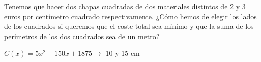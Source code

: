\documentclass[addpoints,spanish, 12pt,a4paper]{exam}
\begin{document}
\begin{questions}
\begin{solution}
\end{solution}

\addpoints



\question[4] Tenemos que hacer dos chapas cuadradas de dos  materiales distintos de 2 y 3 euros por centímetro cuadrado respectivamente. ¿Cómo hemos de
elegir los lados de los cuadrados si queremos que el coste total sea mínimo y que la suma de los perímetros de los dos cuadrados sea de un metro?

\begin{solution}
$C ( x )=5 x^2 - 150 x + 1875 \to$ 10 y 15 cm
\end{solution}

\addpoints


\addpoints




\end{questions}
\end{document}
